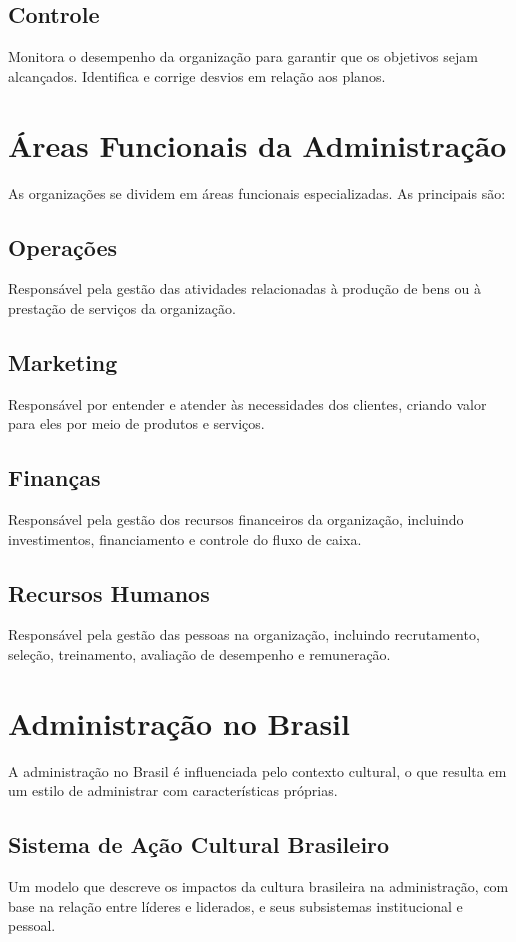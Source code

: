 \documentclass{article}
\begin{document}
\subsection{Controle}
Monitora o desempenho da organização para garantir que os objetivos sejam alcançados. Identifica e corrige desvios em relação aos planos.

\section{Áreas Funcionais da Administração}

As organizações se dividem em áreas funcionais especializadas. As principais são:

\subsection{Operações}
Responsável pela gestão das atividades relacionadas à produção de bens ou à prestação de serviços da organização.

\subsection{Marketing}
Responsável por entender e atender às necessidades dos clientes, criando valor para eles por meio de produtos e serviços.

\subsection{Finanças}
Responsável pela gestão dos recursos financeiros da organização, incluindo investimentos, financiamento e controle do fluxo de caixa.

\subsection{Recursos Humanos}
Responsável pela gestão das pessoas na organização, incluindo recrutamento, seleção, treinamento, avaliação de desempenho e remuneração.

\section{Administração no Brasil}

A administração no Brasil é influenciada pelo contexto cultural, o que resulta em um estilo de administrar com características próprias.

\subsection{Sistema de Ação Cultural Brasileiro}
Um modelo que descreve os impactos da cultura brasileira na administração, com base na relação entre líderes e liderados, e seus subsistemas institucional e pessoal.
\end{document}
